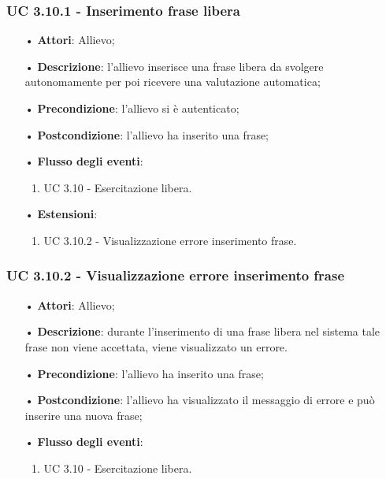\subsubsection{UC 3.10.1 - Inserimento frase libera}
\begin{itemize}
	\item[•]\textbf{Attori}: Allievo;
	\item[•]\textbf{Descrizione}: l'allievo inserisce una frase libera da svolgere autonomamente per poi ricevere una valutazione automatica;
	\item[•]\textbf{Precondizione}: l'allievo si è autenticato;
	\item[•]\textbf{Postcondizione}: l'allievo ha inserito una frase;
	\item[•]\textbf{Flusso degli eventi}: 
	\begin{enumerate}
		\item UC 3.10 - Esercitazione libera.
	\end{enumerate}
	\item[•]\textbf{Estensioni}:
	\begin{enumerate}
		\item UC 3.10.2 - Visualizzazione errore inserimento frase.
	\end{enumerate}
\end{itemize}

\subsubsection{UC 3.10.2 - Visualizzazione errore inserimento frase}
\begin{itemize}
	\item[•]\textbf{Attori}: Allievo;
	\item[•]\textbf{Descrizione}: durante l'inserimento di una frase libera nel sistema tale frase non viene accettata, viene visualizzato un errore.
	\item[•]\textbf{Precondizione}: l'allievo ha inserito una frase;
	\item[•]\textbf{Postcondizione}: l'allievo ha visualizzato il messaggio di errore e può inserire una nuova frase;
	\item[•]\textbf{Flusso degli eventi}:
	\begin{enumerate}
		\item UC 3.10 - Esercitazione libera.
	\end{enumerate}
\end{itemize}

